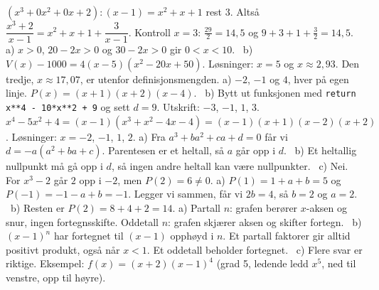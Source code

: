  $(x^3 + 0x^2 + 0x + 2) : (x - 1) = x^2 + x + 1$ rest $3$. Altså $\dfrac{x^3+2}{x-1} = x^2 + x + 1 + \dfrac{3}{x-1}$. Kontroll $x = 3$: $\frac{29}{2} = 14,5$ og $9 + 3 + 1 + \frac{3}{2} = 14,5$.
 a) $x > 0$, $20 - 2x > 0$ og $30 - 2x > 0$ gir $0 < x < 10$. \ b) $V(x) - 1000 = 4(x-5)(x^2 - 20x + 50)$. Løsninger: $x = 5$ og $x \approx 2,93$. Den tredje, $x \approx 17,07$, er utenfor definisjonsmengden.
 a) $-2$, $-1$ og $4$, hver på egen linje. $P(x) = (x+1)(x+2)(x-4)$. \ b) Bytt ut funksjonen med \lstinline[style=laereverk,numbers=none,frame=none]|return x**4 - 10*x**2 + 9| og sett $d = 9$. Utskrift: $-3$, $-1$, $1$, $3$.
 $x^4 - 5x^2 + 4 = (x-1)(x^3 + x^2 - 4x - 4) = (x-1)(x+1)(x-2)(x+2)$. Løsninger: $x = -2$, $-1$, $1$, $2$.
 a) Fra $a^3 + ba^2 + ca + d = 0$ får vi $d = -a(a^2 + ba + c)$. Parentesen er et heltall, så $a$ går opp i $d$. \ b) Et heltallig nullpunkt må gå opp i $d$, så ingen andre heltall kan være nullpunkter. \ c) Nei. For $x^3 - 2$ går $2$ opp i $-2$, men $P(2) = 6 \neq 0$.
 a) $P(1) = 1 + a + b = 5$ og $P(-1) = -1 - a + b = -1$. Legger vi sammen, får vi $2b = 4$, så $b = 2$ og $a = 2$. \ b) Resten er $P(2) = 8 + 4 + 2 = 14$.
 a) Partall $n$: grafen berører $x$-aksen og snur, ingen fortegnsskifte. Oddetall $n$: grafen skjærer aksen og skifter fortegn. \ b) $(x-1)^n$ har fortegnet til $(x-1)$ opphøyd i $n$. Et partall faktorer gir alltid positivt produkt, også når $x < 1$. Et oddetall beholder fortegnet. \ c) Flere svar er riktige. Eksempel: $f(x) = (x+2)(x-1)^4$ (grad 5, ledende ledd $x^5$, ned til venstre, opp til høyre).
